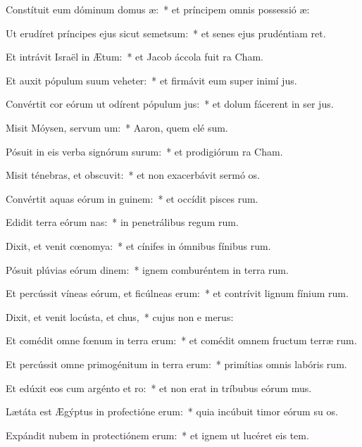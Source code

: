 \item Constítuit eum dóminum domus æ:~* et príncipem omnis possessió æ:
\item Ut erudíret príncipes ejus sicut semetsum:~* et senes ejus prudéntiam ret.
\item Et intrávit Israël in Ætum:~* et Jacob áccola fuit  ra Cham.
\item Et auxit pópulum suum veheter:~* et firmávit eum super inimí jus.
\item Convértit cor eórum ut odírent pópulum jus:~* et dolum fácerent in ser jus.
\item Misit Móysen, servum um:~* Aaron, quem elé sum.
\item Pósuit in eis verba signórum surum:~* et prodigiórum  ra Cham.
\item Misit ténebras, et obscuvit:~* et non exacerbávit sermó os.
\item Convértit aquas eórum in guinem:~* et occídit pisces rum.
\item Edidit terra eórum nas:~* in penetrálibus regum rum.
\item Dixit, et venit cœnomya:~* et cínifes in ómnibus fínibus rum.
\item Pósuit plúvias eórum dinem:~* ignem comburéntem in terra rum.
\item Et percússit víneas eórum, et ficúlneas erum:~* et contrívit lignum fínium rum.
\item Dixit, et venit locústa, et chus,~* cujus non e merus:
\item Et comédit omne fœnum in terra erum:~* et comédit omnem fructum terræ rum.
\item Et percússit omne primogénitum in terra erum:~* primítias omnis labóris rum.
\item Et edúxit eos cum argénto et ro:~* et non erat in tríbubus eórum mus.
\item Lætáta est Ægýptus in profectióne erum:~* quia incúbuit timor eórum su os.
\item Expándit nubem in protectiónem erum:~* et ignem ut lucéret eis  tem.
